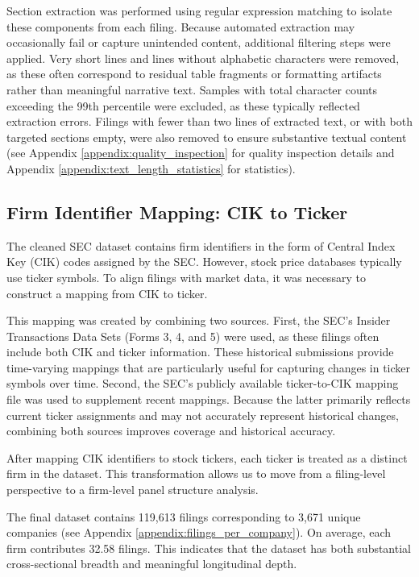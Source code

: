 Section extraction was performed using regular expression matching to isolate these components from each filing. 
Because automated extraction may occasionally fail or capture unintended content, additional filtering steps were applied. 
Very short lines and lines without alphabetic characters were removed, as these often correspond to residual table fragments or formatting artifacts rather than meaningful narrative text. 
Samples with total character counts exceeding the 99th percentile were excluded, as these typically reflected extraction errors. 
Filings with fewer than two lines of extracted text, or with both targeted sections empty, were also removed to ensure substantive textual content (see Appendix \ref{appendix:quality_inspection} for quality inspection details
and Appendix \ref{appendix:text_length_statistics} for statistics).

\subsection{Firm Identifier Mapping: CIK to Ticker}

The cleaned SEC dataset contains firm identifiers in the form of Central Index Key (CIK) codes assigned by the SEC. 
However, stock price databases typically use ticker symbols. 
To align filings with market data, it was necessary to construct a mapping from CIK to ticker.

This mapping was created by combining two sources. 
First, the SEC's Insider Transactions Data Sets (Forms 3, 4, and 5) were used, as these filings often include both CIK and ticker information. 
These historical submissions provide time-varying mappings that are particularly useful for capturing changes in ticker symbols over time. 
Second, the SEC's publicly available ticker-to-CIK mapping file\cite{sec_ticker_list} was used to supplement recent mappings. 
Because the latter primarily reflects current ticker assignments and may not accurately represent historical changes, combining both sources improves coverage and historical accuracy.

After mapping CIK identifiers to stock tickers, each ticker is treated as a distinct firm in the dataset. This transformation allows us to move from a filing-level perspective to a firm-level panel structure analysis.

The final dataset contains 119,613 filings corresponding to 3,671 unique companies (see Appendix \ref{appendix:filings_per_company}). On average, each firm contributes 32.58 filings. This indicates that the dataset has both substantial cross-sectional breadth and meaningful longitudinal depth.

